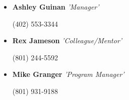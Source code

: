 \documentclass[11pt,a4paper,sans]{moderncv}        %
\begin{document}
\begin{itemize}

\item{\textbf{Ashley Guinan}  \textit{'Manager'}\begin{flushright}\small{{(402) 553-3344}}\end{flushright}}

\item{\textbf{Rex Jameson} \textit{'Colleague/Mentor'}\begin{flushright}\small{{(801) 244-5592}}\end{flushright}}

\item{\textbf{Mike Granger} \textit{'Program Manager'}\begin{flushright}\small{{(801) 931-9188}}\end{flushright}}
\end{itemize}

\nocite{*}



\end{document}
